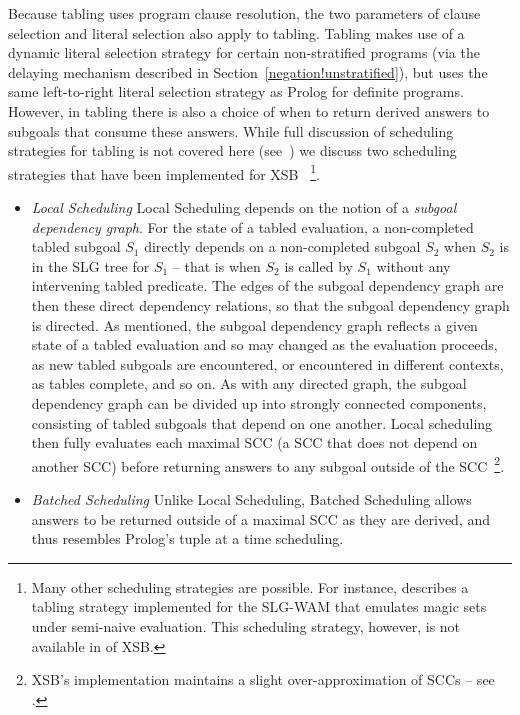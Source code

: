 Because tabling uses program clause resolution, the two parameters of
clause selection and literal selection also apply to tabling.  Tabling
makes use of a dynamic literal selection strategy for certain
non-stratified programs (via the delaying mechanism described in
Section~\ref{negation!unstratified}), but uses the same left-to-right
literal selection strategy as Prolog for definite programs.  However,
in tabling there is also a choice of when to return derived answers to
subgoals that consume these answers.  While full discussion of
scheduling strategies for tabling is not covered here
(see~\cite{JFLP-Scheduling}) we discuss two scheduling strategies
that have been implemented for XSB \version~\footnote{Many other
  scheduling strategies are possible.  For instance, \cite{FrSW97}
  describes a tabling strategy implemented for the SLG-WAM that
  emulates magic sets under semi-naive evaluation.  This scheduling
  strategy, however, is not available in \version{} of XSB.}.

\begin{itemize}

\item {\em Local Scheduling} Local Scheduling depends on the notion of
  a {\em subgoal dependency graph}.  For the state of a tabled
  evaluation, a non-completed tabled subgoal $S_1$ directly depends on
  a non-completed subgoal $S_2$ when $S_2$ is in the SLG tree for
  $S_1$ -- that is when $S_2$ is called by $S_1$ without any
  intervening tabled predicate.  The edges of the subgoal dependency
  graph are then these direct dependency relations, so that the
  subgoal dependency graph is directed.  As mentioned, the subgoal
  dependency graph reflects a given state of a tabled evaluation and
  so may changed as the evaluation proceeds, as new tabled subgoals
  are encountered, or encountered in different contexts, as tables
  complete, and so on.  As with any directed graph, the subgoal
  dependency graph can be divided up into strongly connected
  components, consisting of tabled subgoals that depend on one
  another.  Local scheduling then fully evaluates each maximal SCC (a
  SCC that does not depend on another SCC) before returning answers to
  any subgoal outside of the SCC~\footnote{XSB's implementation
    maintains a slight over-approximation of SCCs -- see
    \cite{JFLP-Scheduling}.}.

\item {\em Batched Scheduling} Unlike Local Scheduling, Batched
  Scheduling allows answers to be returned outside of a maximal SCC as
  they are derived, and thus resembles Prolog's tuple at a time
  scheduling.  
\end{itemize}

